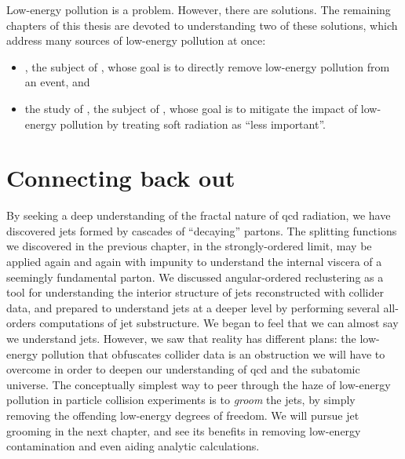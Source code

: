 Low-energy pollution is a problem.
%
However, there are solutions.
%
The remaining chapters of this thesis are devoted to understanding two of these solutions, which address many sources of low-energy pollution at once:
\begin{itemize}
    \item
        , the subject of , whose goal is to directly remove low-energy pollution from an event, and

    \item
        the study of , the subject of , whose goal is to mitigate the impact of low-energy pollution by treating soft radiation as ``less important''.
\end{itemize}



\section{Connecting back out}

By seeking a deep understanding of the fractal nature of \gls{qcd} radiation, we have discovered jets formed by cascades of ``decaying'' partons.
%
The splitting functions we discovered in the previous chapter, in the strongly-ordered limit, may be applied again and again with impunity to understand the internal viscera of a seemingly fundamental parton.
%
We discussed angular-ordered \gls{reclustering} as a tool for understanding the interior structure of jets reconstructed with collider data, and prepared to understand jets at a deeper level by performing several all-orders computations of jet substructure.
%
We began to feel that we can almost say we understand jets.
%
However, we saw that reality has different plans:
%
the low-energy pollution that obfuscates collider data is an obstruction we will have to overcome in order to deepen our understanding of \gls{qcd} and the subatomic universe.
%
The conceptually simplest way to peer through the haze of low-energy pollution in particle collision experiments is to \textit{groom} the jets, by simply removing the offending low-energy degrees of freedom.
%
We will pursue jet grooming in the next chapter, and see its benefits in removing low-energy contamination and even aiding analytic calculations.



